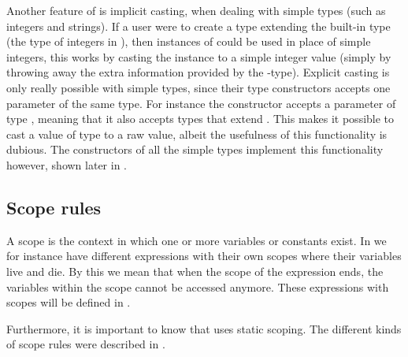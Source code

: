 Another feature of \productname{} is implicit casting, when dealing with simple
types (such as integers and strings). If a user were to create a type
 extending the built-in type  (the type of
integers in \productname{}), then instances of  could be used in
place of simple integers, this works by casting the instance to a simple integer
value (simply by throwing away the extra information provided by the
-type). Explicit casting is only really possible with simple
types, since their type constructors accepts one parameter of the same type. For
instance the constructor  accepts a parameter of type
, meaning that it also accepts types that extend .
This makes it possible to cast a value of type  to a raw
 value, albeit the usefulness of this functionality is dubious.
The constructors of all the simple types implement this functionality however, shown later in .

\subsection*{Scope rules}

A scope is the context in which one or more variables or constants exist. In
\productname{} we for instance have different expressions with their own scopes
where their variables live and die. By this we mean that when the scope of the
expression ends, the variables within the scope cannot be accessed anymore.
These expressions with scopes will be defined in .

Furthermore, it is important to know that \productname{} uses static scoping.
The different kinds of scope rules were described in .








